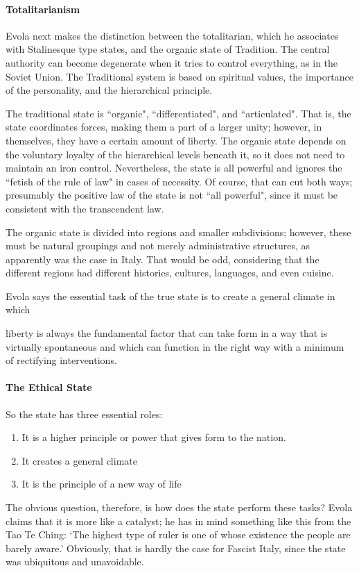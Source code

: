 \paragraph{Totalitarianism}
Evola next makes the distinction between the totalitarian, which he associates with Stalinesque type states, and the organic state of Tradition. The central authority can become degenerate when it tries to control everything, as in the Soviet Union. The Traditional system is based on spiritual values, the importance of the personality, and the hierarchical principle.

The traditional state is ``organic", ``differentiated", and ``articulated". That is, the state coordinates forces, making them a part of a larger unity; however, in themselves, they have a certain amount of liberty. The organic state depends on the voluntary loyalty of the hierarchical levels beneath it, so it does not need to maintain an iron control. Nevertheless, the state is all powerful and ignores the ``fetish of the rule of law" in cases of necessity. Of course, that can cut both ways; presumably the positive law of the state is not ``all powerful", since it must be consistent with the transcendent law.

The organic state is divided into regions and smaller subdivisions; however, these must be natural groupings and not merely administrative structures, as apparently was the case in Italy. That would be odd, considering that the different regions had different histories, cultures, languages, and even cuisine.

Evola says the essential task of the true state is to create a general climate in which

\begin{quotex}
liberty is always the fundamental factor that can take form in a way that is virtually spontaneous and which can function in the right way with a minimum of rectifying interventions. 

\end{quotex}
\paragraph{The Ethical State}
So the state has three essential roles:

\begin{enumerate}
\item It is a higher principle or power that gives form to the nation. 
\item It creates a general climate 
\item It is the principle of a new way of life 
\end{enumerate}
The obvious question, therefore, is how does the state perform these tasks? Evola claims that it is more like a catalyst; he has in mind something like this from the Tao Te Ching: `The highest type of ruler is one of whose existence the people are barely aware.' Obviously, that is hardly the case for Fascist Italy, since the state was ubiquitous and unavoidable.

